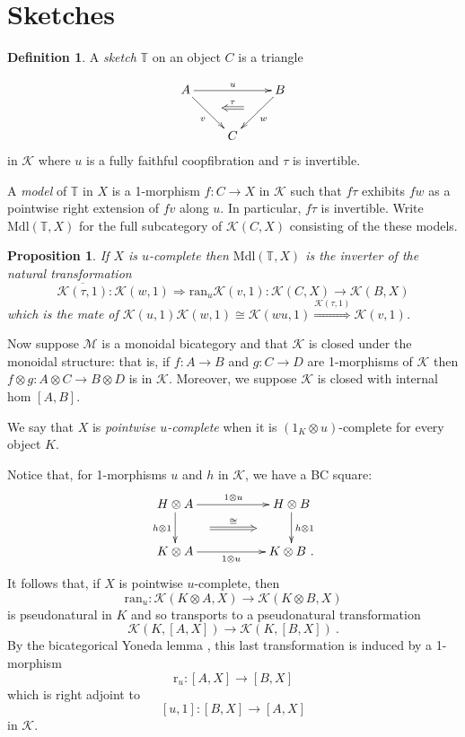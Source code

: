 \documentclass[a4paper,12pt]{article}
\newtheorem{proposition}[theorem]{Proposition}
\theoremstyle{definition}
\newtheorem*{Definition}{Definition}%
\theoremstyle{fact}
\theoremstyle{genquest}
\theoremstyle{step}
\newcommand{\lra}{\longrightarrow}
\newcommand{\Lra}{\Longrightarrow}
\def\CK{{\mathscr K}}
\def\CM{{\mathscr M}}
\begin{document}
{\section{Sketches}

\begin{Definition} A {\em sketch} $\mathbb{T}$ on an object $C$ is a triangle

\begin{equation}\label{sketch}
\begin{aligned}
\xymatrix{
A \ar[rd]_{v}^(0.5){\phantom{a}}="1" \ar[rr]^{u}  && B \ar[ld]^{w}_(0.5){\phantom{a}}="2" \ar@{<=}"1";"2"^-{\tau}
\\
& C 
}
\end{aligned}
\end{equation}
in $\CK$ where $u$ is a fully faithful coopfibration and $\tau$ is invertible. 

A {\em model} of $\mathbb{T}$ in $X$ is a 1-morphism $f : C \lra X$ in $\CK$ such that $f\tau$
exhibits $fw$ as a pointwise right extension of $fv$ along $u$. 
In particular, $f\tau$ is invertible. 
Write $\mathrm{Mdl}(\mathbb{T},X)$ for the full subcategory of $\CK(C,X)$ consisting of
the these models.
\end{Definition}

\begin{proposition}
If $X$ is $u$-complete then $\mathrm{Mdl}(\mathbb{T},X)$ is the inverter of the natural transformation
$$\overline{\CK(\tau,1)}:\CK(w,1)  \Lra \mathrm{ran}_u \CK(v,1) : \CK(C,X)\lra \CK(B,X)$$
which is the mate of $\CK(u,1)\CK(w,1)\cong \CK(wu,1)  \stackrel{\CK(\tau,1)} \Lra \CK(v,1)$. 
\end{proposition}

Now suppose $\CM$ is a monoidal bicategory and that $\CK$ is closed under the monoidal structure:
that is, if $f:A\lra B$ and $g:C\lra D$ are 1-morphisms of $\CK$ then 
$f\otimes g:A\otimes C\lra B\otimes D$ is in $\CK$. 
Moreover, we suppose $\CK$ is closed with internal hom $[A,B]$. 

We say that $X$ is {\em pointwise $u$-complete} when it is $(1_K\otimes u)$-complete for every object $K$.

Notice that, for 1-morphisms $u$ and $h$ in $\CK$, we have a BC square:
\begin{equation}
\xymatrix{
H\otimes A \ar[d]_{h\otimes 1}^(0.5){\phantom{aaaaa}}="1" \ar[rr]^{1\otimes u}  && H\otimes B \ar[d]^{h\otimes 1}_(0.5){\phantom{aaaaa}}="2" \ar@{=>}"1";"2"^-{\cong}
\\
K\otimes A \ar[rr]_-{1\otimes u} && K\otimes B \ . 
}
\end{equation}
It follows that, if $X$ is pointwise $u$-complete, then 
$$\mathrm{ran}_u : \CK(K\otimes A, X)\lra \CK(K\otimes B, X)$$
is pseudonatural in $K$ and so transports to a pseudonatural transformation
 $$\CK(K,[A, X])\lra \CK(K,[B, X]) \ .$$
 By the bicategorical Yoneda lemma \cite{FiB}, this last transformation is induced
 by a 1-morphism
 $$\mathrm{r}_u : [A,X] \lra [B,X]$$
 which is right adjoint to
 $$[u,1] : [B,X] \lra [A,X] $$
 in $\CK$. 
 
}
\end{document}
